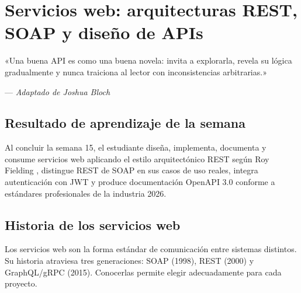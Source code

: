 \documentclass[11pt,a4paper,openany]{book}
\begin{document}
\chapter{Servicios web: arquitecturas REST, SOAP y diseño de APIs}
\label{cap:semana15}

\epigraph{«Una buena API es como una buena novela: invita a explorarla,
revela su lógica gradualmente y nunca traiciona al lector con
inconsistencias arbitrarias.»}{--- \textit{Adaptado de Joshua Bloch}}

\section*{Resultado de aprendizaje de la semana}
Al concluir la semana 15, el estudiante diseña, implementa, documenta
y consume servicios web aplicando el estilo arquitectónico REST según
Roy Fielding \cite{fielding2000rest}, distingue REST de SOAP en sus
casos de uso reales, integra autenticación con JWT y produce
documentación OpenAPI 3.0 conforme a estándares profesionales de la
industria 2026.

\section{Historia de los servicios web}

Los servicios web son la forma estándar de comunicación
entre sistemas distintos. Su historia atraviesa tres generaciones:
SOAP (1998), REST (2000) y GraphQL/gRPC (2015). Conocerlas permite
elegir adecuadamente para cada proyecto.
\end{document}

